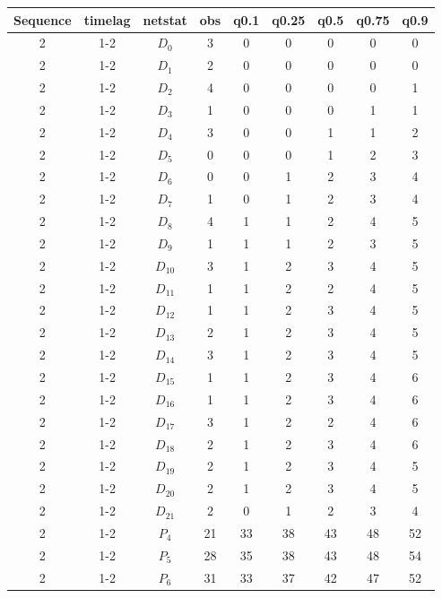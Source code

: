 \documentclass[aspectratio=169,ignorenonframetext,9pt]{beamer}
\theoremstyle{plain}
\theoremstyle{definition}
\begin{document}
\begin{table}[h!]
    \centering
        \begin{tabular}{c| c | c | c | c |c |c |c |c }
            Sequence& timelag & netstat & obs & q0.1 & q0.25 & q0.5 & q0.75 & q0.9 \\
            \hline \hline
            2 & 1-2 & $D_0$ & 3 &  0& 0& 0& 0& 0 \\
            2 & 1-2 & $D_1$ & 2 &  0& 0& 0& 0& 0 \\
            2 & 1-2 & $D_2$ & 4 &  0& 0& 0& 0& 1 \\
            2 & 1-2 & $D_3$ & 1 &  0& 0& 0& 1& 1 \\
            2 & 1-2 & $D_4$ & 3 &  0& 0& 1& 1& 2 \\
            2 & 1-2 & $D_5$ & 0 &  0& 0& 1& 2& 3 \\
            2 & 1-2 & $D_6$ & 0 &  0& 1& 2& 3& 4 \\
            2 & 1-2 & $D_7$ & 1 &  0& 1& 2& 3& 4 \\
            2 & 1-2 & $D_8$ & 4 &  1& 1& 2& 4& 5 \\
            2 & 1-2 & $D_9$ & 1 &  1& 1& 2& 3& 5 \\
            2 & 1-2 & $D_{10}$ & 3 &  1& 2& 3& 4& 5 \\
            2 & 1-2 & $D_{11}$ & 1 &  1& 2& 2& 4& 5 \\
            2 & 1-2 & $D_{12}$ & 1 &  1& 2& 3& 4& 5 \\
            2 & 1-2 & $D_{13}$ & 2 &  1& 2& 3& 4& 5 \\
            2 & 1-2 & $D_{14}$ & 3 &  1& 2& 3& 4& 5 \\
            2 & 1-2 & $D_{15}$ & 1 &  1& 2& 3& 4& 6 \\
            2 & 1-2 & $D_{16}$ & 1 &  1& 2& 3& 4& 6 \\
            2 & 1-2 & $D_{17}$ & 3 &  1& 2& 2& 4& 6 \\
            2 & 1-2 & $D_{18}$ & 2 &  1& 2& 3& 4& 6 \\
            2 & 1-2 & $D_{19}$ & 2 &  1& 2& 3& 4& 5 \\
            2 & 1-2 & $D_{20}$ & 2 &  1& 2& 3& 4& 5 \\
            2 & 1-2 & $D_{21}$ & 2 &  0& 1& 2& 3& 4 \\
            2 & 1-2 & $P_4$ & 21 & 33& 38& 43& 48& 52 \\
            2 & 1-2 & $P_5$ & 28 & 35& 38& 43& 48& 54 \\
            2 & 1-2 & $P_6$ & 31 & 33& 37& 42& 47& 52 \\

\end{tabular}
\end{table}
\end{document}
